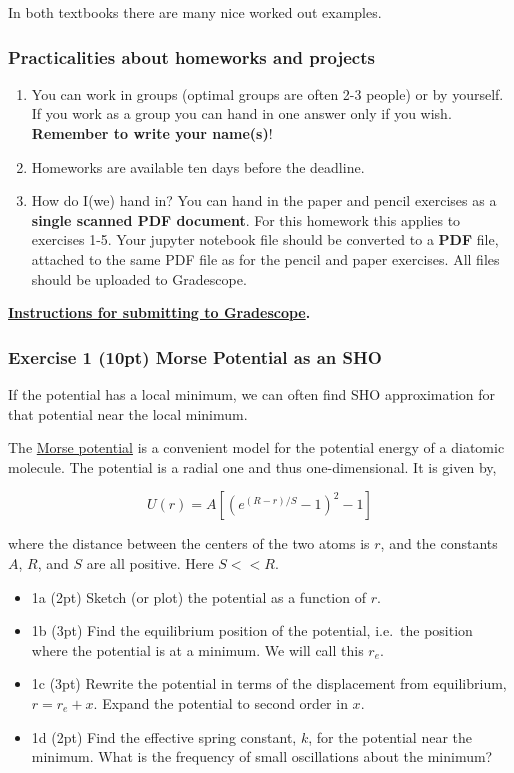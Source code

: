 \documentclass[11pt]{article}
\providecommand{\tightlist}{%
      \setlength{\itemsep}{0pt}\setlength{\parskip}{0pt}}
\begin{document}
In both textbooks there are many nice worked out examples.

\subsubsection{Practicalities about homeworks and
projects}\label{practicalities-about-homeworks-and-projects}

\begin{enumerate}
\def\labelenumi{\arabic{enumi}.}
\item
  You can work in groups (optimal groups are often 2-3 people) or by
  yourself. If you work as a group you can hand in one answer only if
  you wish. \textbf{Remember to write your name(s)}!
\item
  Homeworks are available ten days before the deadline.
\item
  How do I(we) hand in? You can hand in the paper and pencil exercises
  as a \textbf{single scanned PDF document}. For this homework this
  applies to exercises 1-5. Your jupyter notebook file should be
  converted to a \textbf{PDF} file, attached to the same PDF file as for
  the pencil and paper exercises. All files should be uploaded to
  Gradescope.
\end{enumerate}

\textbf{\href{../resources/gradescope-submissions.md}{Instructions for
submitting to Gradescope}.}

    \subsubsection{Exercise 1 (10pt) Morse Potential as an
SHO}\label{exercise-1-10pt-morse-potential-as-an-sho}

If the potential has a local minimum, we can often find SHO
approximation for that potential near the local minimum.

The \href{https://en.wikipedia.org/wiki/Morse_potential}{Morse
potential} is a convenient model for the potential energy of a diatomic
molecule. The potential is a radial one and thus one-dimensional. It is
given by,

\[U(r) = A\left[ \left(e^{(R-r)/S}-1\right)^2-1\right]\]

where the distance between the centers of the two atoms is \(r\), and
the constants \(A\), \(R\), and \(S\) are all positive. Here \(S<<R\).

\begin{itemize}
\tightlist
\item
  1a (2pt) Sketch (or plot) the potential as a function of \(r\).
\item
  1b (3pt) Find the equilibrium position of the potential, i.e.~the
  position where the potential is at a minimum. We will call this
  \(r_e\).
\item
  1c (3pt) Rewrite the potential in terms of the displacement from
  equilibrium, \(r = r_e + x\). Expand the potential to second order in
  \(x\).
\item
  1d (2pt) Find the effective spring constant, \(k\), for the potential
  near the minimum. What is the frequency of small oscillations about
  the minimum?
\end{itemize}
\end{document}
